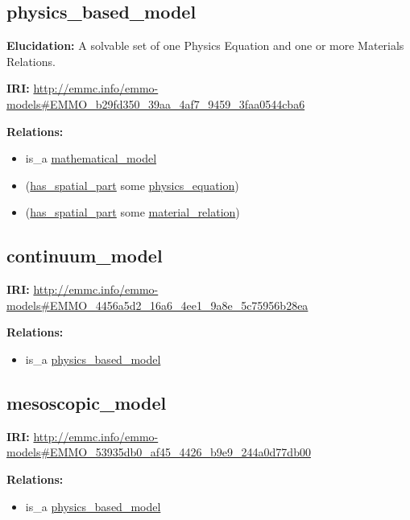 \documentclass[a4paper,]{report}
\providecommand{\tightlist}{%
  \setlength{\itemsep}{0pt}\setlength{\parskip}{0pt}}
\begin{document}
\hypertarget{physics_based_model}{%
\subsection{physics\_based\_model}\label{physics_based_model}}

\textbf{Elucidation:} A solvable set of one Physics Equation and one or
more Materials Relations.

\textbf{IRI:}
\url{http://emmc.info/emmo-models\#EMMO_b29fd350_39aa_4af7_9459_3faa0544cba6}

\textbf{Relations:}

\begin{itemize}
\tightlist
\item
  is\_a \protect\hyperlink{mathematical_model}{mathematical\_model}
\item
  (\protect\hyperlink{has_spatial_part}{has\_spatial\_part} some
  \protect\hyperlink{physics_equation}{physics\_equation})
\item
  (\protect\hyperlink{has_spatial_part}{has\_spatial\_part} some
  \protect\hyperlink{material_relation}{material\_relation})
\end{itemize}

\hypertarget{continuum_model}{%
\subsection{continuum\_model}\label{continuum_model}}

\textbf{IRI:}
\url{http://emmc.info/emmo-models\#EMMO_4456a5d2_16a6_4ee1_9a8e_5c75956b28ea}

\textbf{Relations:}

\begin{itemize}
\tightlist
\item
  is\_a \protect\hyperlink{physics_based_model}{physics\_based\_model}
\end{itemize}

\hypertarget{mesoscopic_model}{%
\subsection{mesoscopic\_model}\label{mesoscopic_model}}

\textbf{IRI:}
\url{http://emmc.info/emmo-models\#EMMO_53935db0_af45_4426_b9e9_244a0d77db00}

\textbf{Relations:}

\begin{itemize}
\tightlist
\item
  is\_a \protect\hyperlink{physics_based_model}{physics\_based\_model}
\end{itemize}
\end{document}
